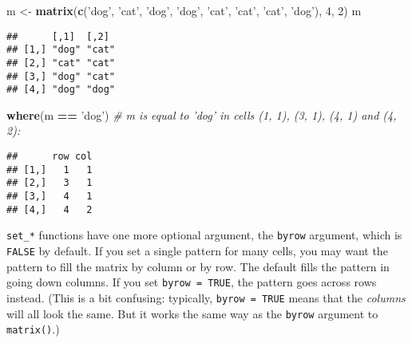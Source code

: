\documentclass[]{article}
\newenvironment{Shaded}{\begin{snugshade}}{\end{snugshade}}
\newcommand{\KeywordTok}[1]{\textcolor[rgb]{0.13,0.29,0.53}{\textbf{#1}}}
\newcommand{\DecValTok}[1]{\textcolor[rgb]{0.00,0.00,0.81}{#1}}
\newcommand{\StringTok}[1]{\textcolor[rgb]{0.31,0.60,0.02}{#1}}
\newcommand{\CommentTok}[1]{\textcolor[rgb]{0.56,0.35,0.01}{\textit{#1}}}
\newcommand{\OperatorTok}[1]{\textcolor[rgb]{0.81,0.36,0.00}{\textbf{#1}}}
\newcommand{\NormalTok}[1]{#1}
\begin{document}
\begin{Shaded}
\begin{Highlighting}[]
\NormalTok{m <-}\StringTok{ }\KeywordTok{matrix}\NormalTok{(}\KeywordTok{c}\NormalTok{(}\StringTok{'dog'}\NormalTok{, }\StringTok{'cat'}\NormalTok{, }\StringTok{'dog'}\NormalTok{, }\StringTok{'dog'}\NormalTok{, }\StringTok{'cat'}\NormalTok{, }\StringTok{'cat'}\NormalTok{, }\StringTok{'cat'}\NormalTok{, }\StringTok{'dog'}\NormalTok{), }\DecValTok{4}\NormalTok{, }\DecValTok{2}\NormalTok{)}
\NormalTok{m}
\end{Highlighting}
\end{Shaded}

\begin{verbatim}
##      [,1]  [,2] 
## [1,] "dog" "cat"
## [2,] "cat" "cat"
## [3,] "dog" "cat"
## [4,] "dog" "dog"
\end{verbatim}

\begin{Shaded}
\begin{Highlighting}[]
\KeywordTok{where}\NormalTok{(m }\OperatorTok{==}\StringTok{ 'dog'}\NormalTok{) }\CommentTok{# m is equal to 'dog' in cells (1, 1), (3, 1), (4, 1) and (4, 2):}
\end{Highlighting}
\end{Shaded}

\begin{verbatim}
##      row col
## [1,]   1   1
## [2,]   3   1
## [3,]   4   1
## [4,]   4   2
\end{verbatim}

\FloatBarrier

\texttt{set\_*} functions have one more optional argument, the
\texttt{byrow} argument, which is \texttt{FALSE} by default. If you set
a single pattern for many cells, you may want the pattern to fill the
matrix by column or by row. The default fills the pattern in going down
columns. If you set \texttt{byrow\ =\ TRUE}, the pattern goes across
rows instead. (This is a bit confusing: typically,
\texttt{byrow\ =\ TRUE} means that the \emph{columns} will all look the
same. But it works the same way as the \texttt{byrow} argument to
\texttt{matrix()}.)
\end{document}
